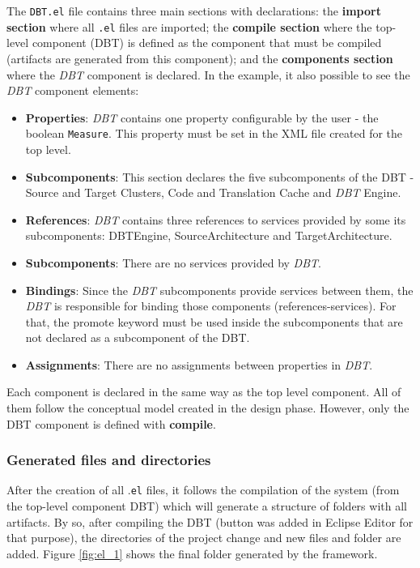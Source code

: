 The \texttt{DBT.el} file contains three main sections with declarations: the \textbf{import section} where all \texttt{.el}
 files are imported; the \textbf{compile section} where the top-level component (DBT) is defined as the component that must be compiled (artifacts are generated from this component); and the \textbf{components section} where the \textit{DBT} component is declared.
In the example, it also possible to see the \textit{DBT} component elements:
\begin{itemize}
\item \textbf{Properties}: \textit{DBT} contains one property configurable by the user - the boolean \texttt{Measure}. This property must be set in the XML file created for the top level.
\item \textbf{Subcomponents}: This section declares the five subcomponents of the DBT - Source and Target Clusters, Code and Translation Cache and \textit{DBT} Engine.
\item \textbf{References}: \textit{DBT} contains three references to services provided by some its subcomponents: DBTEngine, SourceArchitecture and TargetArchitecture.
\item \textbf{Subcomponents}: There are no services provided by \textit{DBT}.
\item \textbf{Bindings}: Since the \textit{DBT} subcomponents provide services between them, the \textit{DBT} is responsible for binding those components (references-services). For that, the promote keyword must be used inside the subcomponents that are not declared as a subcomponent of the DBT. 
\item \textbf{Assignments}: There are no assignments between properties in \textit{DBT}.
\end{itemize}

Each component is declared in the same way as the top level component. All of them follow the conceptual model created in the design phase. However, only the DBT component is defined with \textbf{compile}.  


\subsubsection{Generated files and directories}

After the creation of all .\texttt{el} files, it follows the compilation of the system (from the top-level component DBT) which will generate a structure of folders with all artifacts. By so, after compiling the DBT (button was added in Eclipse Editor for that purpose), the directories of the project change and new files and folder are added. Figure \ref{fig:el_1} shows the final folder generated by the framework. 

